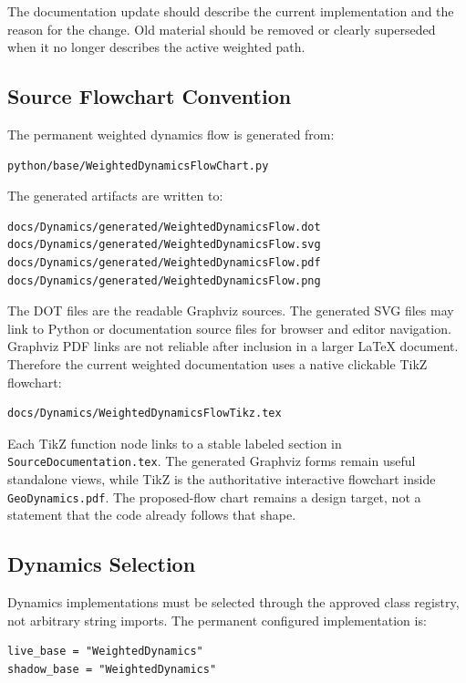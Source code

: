 The documentation update should describe the current implementation and the
reason for the change.  Old material should be removed or clearly superseded
when it no longer describes the active weighted path.

\subsection{Source Flowchart Convention}

The permanent weighted dynamics flow is generated from:

\begin{verbatim}
python/base/WeightedDynamicsFlowChart.py
\end{verbatim}

The generated artifacts are written to:

\begin{verbatim}
docs/Dynamics/generated/WeightedDynamicsFlow.dot
docs/Dynamics/generated/WeightedDynamicsFlow.svg
docs/Dynamics/generated/WeightedDynamicsFlow.pdf
docs/Dynamics/generated/WeightedDynamicsFlow.png
\end{verbatim}

The DOT files are the readable Graphviz sources.  The generated SVG files may
link to Python or documentation source files for browser and editor navigation.
Graphviz PDF links are not reliable after inclusion in a larger LaTeX document.
Therefore the current weighted documentation uses a native clickable TikZ
flowchart:

\begin{verbatim}
docs/Dynamics/WeightedDynamicsFlowTikz.tex
\end{verbatim}

Each TikZ function node links to a stable labeled section in
\texttt{SourceDocumentation.tex}.  The generated Graphviz forms remain useful
standalone views, while TikZ is the authoritative interactive flowchart inside
\texttt{GeoDynamics.pdf}.  The proposed-flow chart remains a design target, not
a statement that the code already follows that shape.

\subsection{Dynamics Selection}

Dynamics implementations must be selected through the approved class registry,
not arbitrary string imports.  The permanent configured implementation is:

\begin{verbatim}
live_base = "WeightedDynamics"
shadow_base = "WeightedDynamics"
\end{verbatim}

